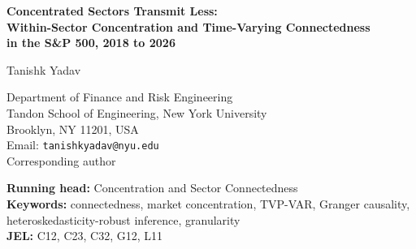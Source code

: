 \documentclass[11pt]{article}
\begin{document}
\thispagestyle{empty}
\begin{center}
{\Large\bfseries Concentrated Sectors Transmit Less:\\Within-Sector Concentration and Time-Varying Connectedness\\in the S\&P 500, 2018 to 2026\par}
\vspace{2em}
{\large Tanishk Yadav\par}
\vspace{1em}
Department of Finance and Risk Engineering\\
Tandon School of Engineering, New York University\\
Brooklyn, NY 11201, USA\\
Email: \texttt{tanishkyadav@nyu.edu}\\[1em]
Corresponding author
\end{center}
\vspace{2em}
\noindent\textbf{Running head:} Concentration and Sector Connectedness\\
\noindent\textbf{Keywords:} connectedness, market concentration, TVP-VAR, Granger causality, heteroskedasticity-robust inference, granularity\\
\noindent\textbf{JEL:} C12, C23, C32, G12, L11
\end{document}
